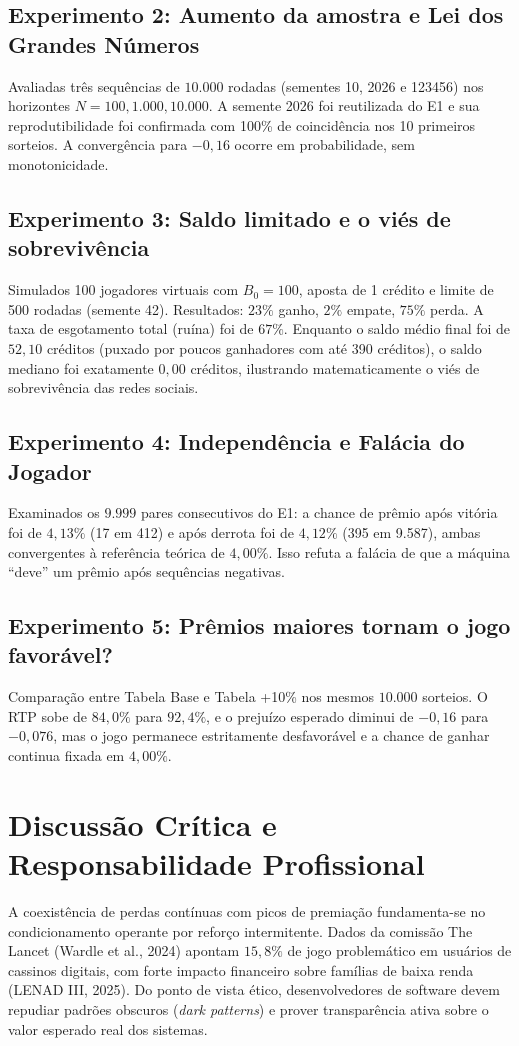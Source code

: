\documentclass[10pt,a4paper]{article}
\begin{document}
\subsection{Experimento 2: Aumento da amostra e Lei dos Grandes Números}
Avaliadas três sequências de $10.000$ rodadas (sementes 10, 2026 e 123456) nos horizontes $N = 100, 1.000, 10.000$. A semente 2026 foi reutilizada do E1 e sua reprodutibilidade foi confirmada com 100\% de coincidência nos 10 primeiros sorteios. A convergência para $-0{,}16$ ocorre em probabilidade, sem monotonicidade.

\subsection{Experimento 3: Saldo limitado e o viés de sobrevivência}
Simulados 100 jogadores virtuais com $B_0 = 100$, aposta de 1 crédito e limite de 500 rodadas (semente 42). Resultados: $23\%$ ganho, $2\%$ empate, $75\%$ perda. A taxa de esgotamento total (ruína) foi de $67\%$. Enquanto o saldo médio final foi de $52{,}10$ créditos (puxado por poucos ganhadores com até 390 créditos), o saldo mediano foi exatamente $0{,}00$ créditos, ilustrando matematicamente o viés de sobrevivência das redes sociais.

\subsection{Experimento 4: Independência e Falácia do Jogador}
Examinados os $9.999$ pares consecutivos do E1: a chance de prêmio após vitória foi de $4{,}13\%$ (17 em 412) e após derrota foi de $4{,}12\%$ (395 em 9.587), ambas convergentes à referência teórica de $4{,}00\%$. Isso refuta a falácia de que a máquina ``deve'' um prêmio após sequências negativas.

\subsection{Experimento 5: Prêmios maiores tornam o jogo favorável?}
Comparação entre Tabela Base e Tabela +10\% nos mesmos $10.000$ sorteios. O RTP sobe de $84{,}0\%$ para $92{,}4\%$, e o prejuízo esperado diminui de $-0{,}16$ para $-0{,}076$, mas o jogo permanece estritamente desfavorável e a chance de ganhar continua fixada em $4{,}00\%$.

\section{Discussão Crítica e Responsabilidade Profissional}
A coexistência de perdas contínuas com picos de premiação fundamenta-se no condicionamento operante por reforço intermitente. Dados da comissão The Lancet (Wardle et al., 2024) apontam $15{,}8\%$ de jogo problemático em usuários de cassinos digitais, com forte impacto financeiro sobre famílias de baixa renda (LENAD III, 2025). Do ponto de vista ético, desenvolvedores de software devem repudiar padrões obscuros (\textit{dark patterns}) e prover transparência ativa sobre o valor esperado real dos sistemas.
\end{document}
